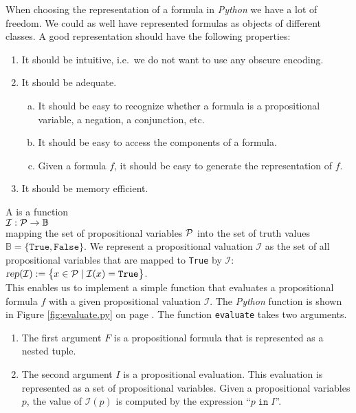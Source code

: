 When choosing the representation of a formula in \textsl{Python} we have a lot of freedom.
We could as well have represented formulas as objects of different classes.  A good representation should have
the following properties:
\begin{enumerate}
\item It should be intuitive, i.e.~we do not want to use any obscure encoding.
\item It should be adequate.
  \begin{enumerate}[(a)]
  \item It should be easy to recognize whether a formula is a propositional variable, a negation, a
        conjunction, etc.
  \item It should be easy to access the components of a formula.
  \item Given a formula $f$, it should be easy to generate the representation of $f$.
  \end{enumerate}
\item It should be memory efficient.
\end{enumerate}

A  is a function  
\\[0.2cm]
\hspace*{1.3cm} ${\cal I}: {\cal P} \rightarrow \mathbb{B}$ \\[0.2cm]
mapping the set of propositional variables ${\cal P}$ into the set of truth values
$\mathbb{B} = \bigl\{ \mathtt{True}, \mathtt{False} \bigr\}$.
We represent a propositional valuation $\mathcal{I}$ as the set of all propositional variables that are mapped
to \texttt{True} by $\mathcal{I}$:
\\[0.2cm]
\hspace*{1.3cm}
$\textsl{rep}(\mathcal{I}) := \bigl\{ x \in \mathcal{P} \mid \mathcal{I}(x) = \texttt{True} \bigr\}$.
\\[0.2cm]
This enables us to implement a simple function that evaluates a propositional formula $f$ with a given
propositional valuation $\mathcal{I}$.
The \textsl{Python} function  is shown in Figure \ref{fig:evaluate.py} on page
\pageref{fig:evaluate.py}. 
The function \texttt{evaluate} takes two arguments.
\begin{enumerate}
\item The first argument $F$ is a propositional formula that is represented as a nested tuple.
\item The second argument $I$ is a propositional evaluation.  This evaluation is represented as a set of
      propositional variables. Given a propositional variables $p$, the value of $\mathcal{I}(p)$ is computed
      by the expression  ``$p \;\mathtt{in}\; I$''.
\end{enumerate}

